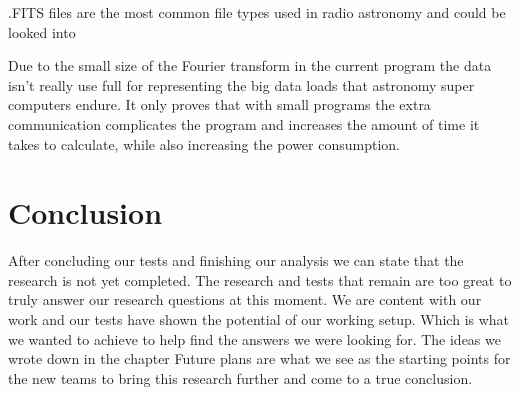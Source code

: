 \documentclass{article}
\begin{document}
.FITS files are the most common file types used in radio astronomy and could be looked into 

Due to the small size of the Fourier transform in the current program the data isn't really use full for representing the big data loads that astronomy super computers endure. It only proves that with small programs the extra communication complicates the program and increases the amount of time it takes to calculate, while also increasing the power consumption.

\section{Conclusion}
After concluding our tests and finishing our analysis we can state that the research is not yet completed. The research and tests that remain are too great to truly answer our research questions at this moment. We are content with our work and our tests have shown the potential of our working setup. Which is what we wanted to achieve to help find the answers we were looking for. The ideas we wrote down in the chapter Future plans are what we see as the starting points for the new teams to bring this research further and come to a true conclusion. 
\end{document}
